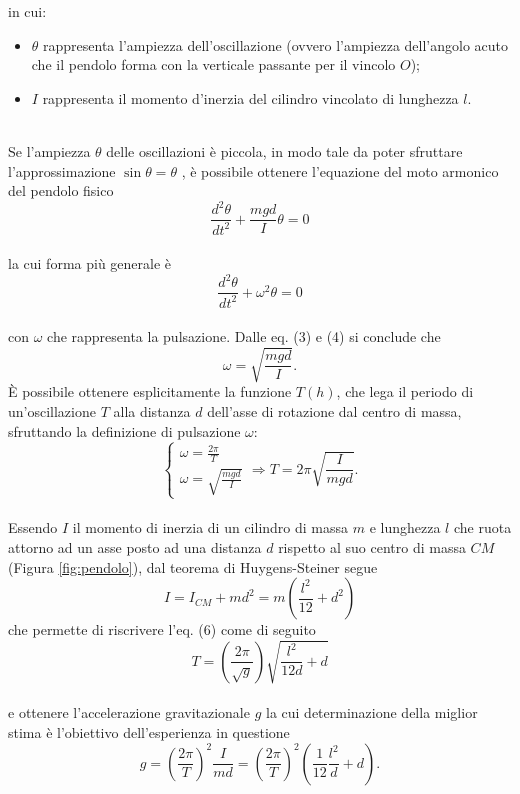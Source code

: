 \documentclass[11pt,a4paper]{article}
\begin{document}
in cui:
\begin{itemize}
    \item $\theta$ rappresenta l'ampiezza dell'oscillazione (ovvero l'ampiezza dell'angolo acuto che il pendolo forma con la verticale passante per il vincolo $O$);
    \item $I$ rappresenta il momento d'inerzia del cilindro vincolato di lunghezza $l$.
\end{itemize}
\\
Se l'ampiezza $\theta$ delle oscillazioni è piccola, in modo tale da poter sfruttare l'approssimazione $\sin \theta = \theta$ , è possibile ottenere l'equazione del moto armonico del pendolo fisico
\begin{equation}
    \frac{d^2 \theta}{dt^2} + \frac{mgd}{I} \theta = 0
\end{equation}
\\
la cui forma più generale è
\begin{equation}
    \frac{d^2 \theta}{dt^2} + \omega^2 \theta = 0
\end{equation}
\\
con $\omega$ che rappresenta la pulsazione. Dalle eq. (3) e (4) si conclude che
\begin{equation}
    \omega = \sqrt{\frac{mgd}{I}}.
\end{equation}
È possibile ottenere esplicitamente la funzione $T(h)$, che lega il periodo di un'oscillazione $T$ alla distanza $d$ dell'asse di rotazione dal centro di massa, sfruttando la definizione di pulsazione $\omega$:
\begin{equation}
    \begin{cases}
        \omega = \frac{2 \pi}{T} \\
        \omega = \sqrt{\frac{mgd}{I}}
    \end{cases} \Longrightarrow
    T = 2 \pi \sqrt{\frac{I}{mgd}}.
\end{equation}
\\
Essendo $I$ il momento di inerzia di un cilindro di massa $m$ e lunghezza $l$ che ruota attorno ad un asse posto ad una distanza $d$ rispetto al suo centro di massa $CM$ (Figura \ref{fig:pendolo}), dal teorema di Huygens-Steiner segue
\begin{equation}
    I = I_{CM} + md^2 = m \left( \frac{l^2}{12} +d^2 \right)
\end{equation}
che permette di riscrivere l'eq. (6) come di seguito
\begin{equation}
    T = \left ( \frac{2 \pi}{\sqrt{g}} \right ) \sqrt{\frac{l^2}{12d}+d}
\end{equation}
\\
e ottenere l'accelerazione gravitazionale $g$ la cui determinazione della miglior stima è l'obiettivo dell'esperienza in questione
\begin{equation}
    g = \left( \frac{2 \pi}{T} \right)^2 \frac{I}{md} = \left( \frac{2 \pi}{T} \right)^2 \left( \frac{1}{12} \frac{l^2}{d} + d \right).
    \label{eq:defg}
\end{equation}
\end{document}

